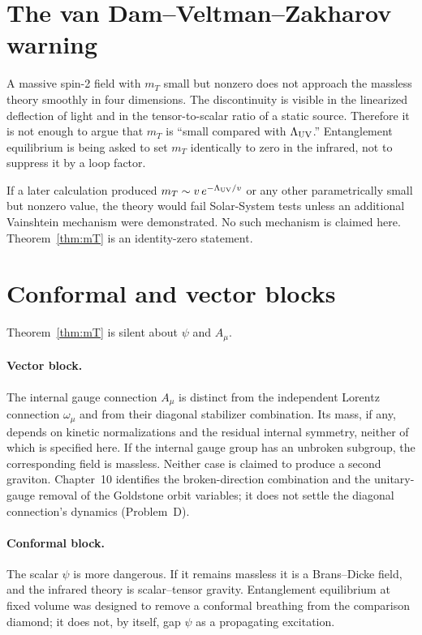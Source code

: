 \section{The van Dam--Veltman--Zakharov warning}
\label{sec:ch7-vDVZ}

A massive spin-2 field with \(m_T\) small but nonzero does not
approach the massless theory smoothly in four dimensions. The
discontinuity is visible in the linearized deflection of light and
in the tensor-to-scalar ratio of a static source. Therefore it is
not enough to argue that \(m_T\) is ``small compared with
\(\Lambda_{\mathrm{UV}}\).'' Entanglement equilibrium is being asked to set
\(m_T\) identically to zero in the infrared, not to suppress it by
a loop factor.

If a later calculation produced \(m_T\sim v\,e^{-\Lambda_{\mathrm{UV}}/v}\) or any
other parametrically small but nonzero value, the theory would fail
Solar-System tests unless an additional Vainshtein mechanism were
demonstrated. No such mechanism is claimed here. Theorem~\ref{thm:mT}
is an identity-zero statement.

\section{Conformal and vector blocks}
\label{sec:ch7-other}

Theorem~\ref{thm:mT} is silent about \(\psi\) and \(A_\mu\).

\paragraph{Vector block.}
The internal gauge connection \(A_\mu\) is distinct from the
independent Lorentz connection \(\omega_\mu\) and from their diagonal
stabilizer combination. Its mass, if any, depends on kinetic
normalizations and the residual internal symmetry, neither of which
is specified here. If the internal gauge group has an unbroken
subgroup, the corresponding field is massless. Neither case is
claimed to produce a second graviton. Chapter~10 identifies the
broken-direction combination and the unitary-gauge removal of the
Goldstone orbit variables; it does not settle the diagonal
connection's dynamics (Problem~D).

\paragraph{Conformal block.}
The scalar \(\psi\) is more dangerous. If it remains massless it
is a Brans--Dicke field, and the infrared theory is scalar--tensor
gravity. Entanglement equilibrium at fixed volume was designed to
remove a conformal breathing from the comparison diamond; it does
not, by itself, gap \(\psi\) as a propagating excitation.

